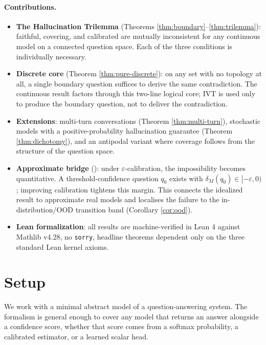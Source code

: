 \documentclass[10pt]{article}
\begin{document}
\paragraph{Contributions.}
\begin{itemize}[nosep,leftmargin=1.5em]
\item \textbf{The Hallucination Trilemma} (Theorems
  \ref{thm:boundary}--\ref{thm:trilemma}): faithful, covering, and
  calibrated are mutually inconsistent for any continuous model on a
  connected question space. Each of the three conditions is individually
  necessary.
\item \textbf{Discrete core} (Theorem \ref{thm:pure-discrete}): on any
  set with no topology at all, a single boundary question suffices to
  derive the same contradiction. The continuous result factors through
  this two-line logical core; IVT is used only to produce the boundary
  question, not to deliver the contradiction.
\item \textbf{Extensions}: multi-turn conversations (Theorem
  \ref{thm:multi-turn}), stochastic models with a positive-probability
  hallucination guarantee (Theorem \ref{thm:dichotomy}), and an antipodal
  variant where coverage follows from the structure of the question space.
\item \textbf{Approximate bridge} (): under
  $\varepsilon$-calibration, the impossibility becomes quantitative.
  A threshold-confidence question $q_0$ exists with
  $\delta_M(q_0) \in [-\varepsilon, 0)$; improving calibration tightens this
  margin. This connects the idealized result to approximate real models and
  localises the failure to the
  in-distribution/OOD transition band (Corollary \ref{cor:ood}).
\item \textbf{Lean formalization}: all results are machine-verified in
  Lean 4 against Mathlib v4.28, no \texttt{sorry}, headline theorems
  dependent only on the three standard Lean kernel axioms.
\end{itemize}

\section{Setup}
\label{sec:setup}

We work with a minimal abstract model of a question-answering system. The
formalism is general enough to cover any model that returns an answer
alongside a confidence score, whether that score comes from a softmax
probability, a calibrated estimator, or a learned scalar head.
\end{document}
